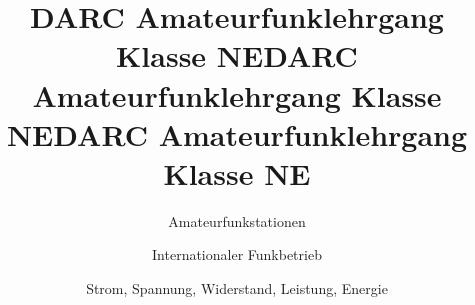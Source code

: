 \documentclass[aspectratio = 169]{beamer}
\begin{document}
\title{DARC Amateurfunklehrgang Klasse NE}
\author{Amateurfunkstationen}
\begin{frame}
\maketitle
\end{frame}















\title{DARC Amateurfunklehrgang Klasse NE}
\author{Internationaler Funkbetrieb}
\begin{frame}
\maketitle
\end{frame}





\title{DARC Amateurfunklehrgang Klasse NE}
\author{Strom, Spannung, Widerstand, Leistung, Energie}
\begin{frame}
\maketitle
\end{frame}























\end{document}
